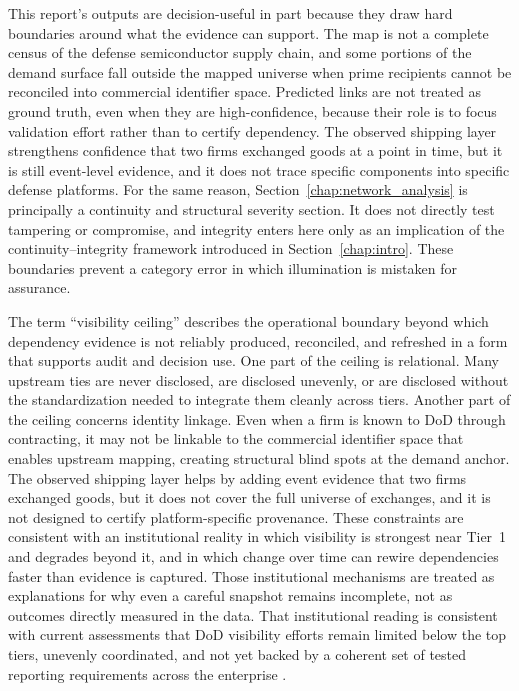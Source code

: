 This report's outputs are decision-useful in part because they draw hard boundaries around what the evidence can support. The map is not a complete census of the defense semiconductor supply chain, and some portions of the demand surface fall outside the mapped universe when prime recipients cannot be reconciled into commercial identifier space. Predicted links are not treated as ground truth, even when they are high-confidence, because their role is to focus validation effort rather than to certify dependency. The observed shipping layer strengthens confidence that two firms exchanged goods at a point in time, but it is still event-level evidence, and it does not trace specific components into specific defense platforms. For the same reason, Section~\ref{chap:network_analysis} is principally a continuity and structural severity section. It does not directly test tampering or compromise, and integrity enters here only as an implication of the continuity--integrity framework introduced in Section~\ref{chap:intro}. These boundaries prevent a category error in which illumination is mistaken for assurance.

The term ``visibility ceiling'' describes the operational boundary beyond which dependency evidence is not reliably produced, reconciled, and refreshed in a form that supports audit and decision use. One part of the ceiling is relational. Many upstream ties are never disclosed, are disclosed unevenly, or are disclosed without the standardization needed to integrate them cleanly across tiers. Another part of the ceiling concerns identity linkage. Even when a firm is known to DoD through contracting, it may not be linkable to the commercial identifier space that enables upstream mapping, creating structural blind spots at the demand anchor. The observed shipping layer helps by adding event evidence that two firms exchanged goods, but it does not cover the full universe of exchanges, and it is not designed to certify platform-specific provenance. These constraints are consistent with an institutional reality in which visibility is strongest near Tier~1 and degrades beyond it, and in which change over time can rewire dependencies faster than evidence is captured. Those institutional mechanisms are treated as explanations for why even a careful snapshot remains incomplete, not as outcomes directly measured in the data. That institutional reading is consistent with current assessments that DoD visibility efforts remain limited below the top tiers, unevenly coordinated, and not yet backed by a coherent set of tested reporting requirements across the enterprise \parencite{U.S.GovernmentAccountabilityOffice2025}.

